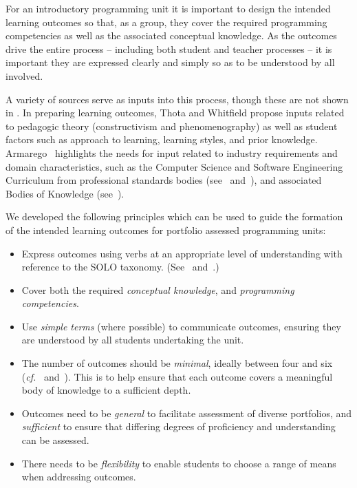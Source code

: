 For an introductory programming unit it is important to design the intended learning outcomes so that, as a group, they cover the required programming competencies as well as the associated conceptual knowledge. As the outcomes drive the entire process -- including both student and teacher processes -- it is important they are expressed clearly and simply so as to be understood by all involved.

A variety of sources serve as inputs into this process, though these are not shown in . In preparing learning outcomes, Thota and Whitfield propose inputs related to pedagogic theory (constructivism and phenomenography) as well as student factors such as approach to learning, learning styles, and prior knowledge. Armarego~\cite{Armarego:2009} highlights the needs for input related to industry requirements and domain characteristics, such as the Computer Science and Software Engineering Curriculum from professional standards bodies (see~\cite{Lethbridge:2006} and~\cite{Cassel:2008}), and associated Bodies of Knowledge (see~\cite{Abran:2001}).

We developed the following principles which can be used to guide the formation of the intended learning outcomes for portfolio assessed programming units:
\begin{itemize}
  \item Express outcomes using verbs at an appropriate level of understanding with reference to the SOLO taxonomy. (See~\cite{Biggs:2007} and~\cite{Biggs:1982}.)
  \item Cover both the required \emph{conceptual knowledge}, and \emph{programming competencies}.
  \item Use \emph{simple terms} (where possible) to communicate outcomes, ensuring they are understood by all students undertaking the unit.
  \item The number of outcomes should be \emph{minimal}, ideally between four and six (\emph{cf.}~\cite{Biggs:2007} and~\cite{Gardner:1994}). This is to help ensure that each outcome covers a meaningful body of knowledge to a sufficient depth.
  \item Outcomes need to be \emph{general} to facilitate assessment of diverse portfolios, and \emph{sufficient} to ensure that differing degrees of proficiency and understanding can be assessed.
  \item There needs to be \emph{flexibility} to enable students to choose a range of means when addressing outcomes.
\end{itemize}

